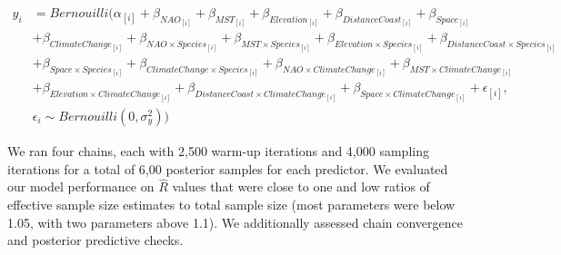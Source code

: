 \documentclass{article}\usepackage[]{graphicx}\usepackage[]{color}
\begin{document}
\begin{align*}
y_i &= Bernouilli(\alpha_{[i]} +  \beta_{NAO_{[i]}} + \beta_{MST_{[i]}} + \beta_{Elevation_{[i]}} + \beta_{DistanceCoast_{[i]}} + \beta_{Space_{[i]}} \\ 
  &+ \beta_{ClimateChange_{[i]}} + \beta_{NAO \times Species_{[i]}} + \beta_{MST \times Species_{[i]}} + \beta_{Elevation \times Species_{[i]}} + \beta_{DistanceCoast \times Species_{[i]}}\\
  &+ \beta_{Space \times Species_{[i]}} + \beta_{ClimateChange \times Species_{[i]}} + \beta_{NAO \times ClimateChange_{[i]}} + \beta_{MST \times ClimateChange_{[i]}}\\
  &+ \beta_{Elevation \times ClimateChange_{[i]}} + \beta_{DistanceCoast \times ClimateChange_{[i]}} + \beta_{Space \times ClimateChange_{[i]}} + \epsilon_{[i]},\nonumber\\
  & \epsilon_i \sim Bernouilli(0,\sigma^2_y))\tag{1}
\end{align*}

We ran four chains, each with 2,500 warm-up iterations and 4,000 sampling iterations for a total of 6,00 posterior samples for each predictor. We evaluated our model performance on $\hat{R}$ values that were close to one and low ratios of effective sample size estimates to total sample size (most parameters were below 1.05, with two parameters above 1.1). We additionally assessed chain convergence and posterior predictive checks.%


\end{document}
